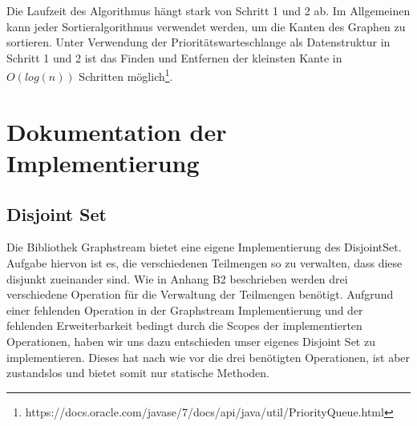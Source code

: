 \documentclass[a4paper]{article}
\begin{document}
Die Laufzeit des Algorithmus hängt stark von Schritt 1 und 2 ab. Im Allgemeinen kann jeder Sortieralgorithmus verwendet werden, um die Kanten des Graphen zu sortieren. Unter Verwendung der Prioritätswarteschlange als Datenstruktur in Schritt 1 und 2 ist das Finden und Entfernen der kleinsten Kante in $O(log(n))$ Schritten möglich\footnote{https://docs.oracle.com/javase/7/docs/api/java/util/PriorityQueue.html}.

\section{Dokumentation der Implementierung}

\subsection{Disjoint Set}

Die Bibliothek Graphstream bietet eine eigene Implementierung des DisjointSet. Aufgabe hiervon ist es, die verschiedenen Teilmengen so zu verwalten, dass diese disjunkt zueinander sind. Wie in Anhang B2 beschrieben\cite{KN2012} werden drei verschiedene Operation für die Verwaltung der Teilmengen benötigt. Aufgrund einer fehlenden Operation in der Graphstream Implementierung und der fehlenden Erweiterbarkeit bedingt durch die Scopes der implementierten Operationen, haben wir uns dazu entschieden unser eigenes Disjoint Set zu implementieren. Dieses hat nach wie vor die drei benötigten Operationen, ist aber zustandslos und bietet somit nur statische Methoden.
\end{document}
